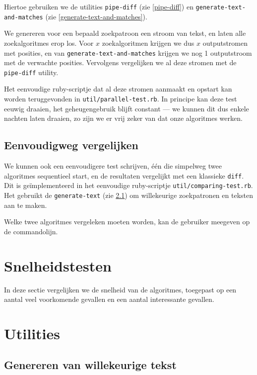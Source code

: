 \documentclass[a4paper,11pt]{article}
\begin{document}
Hiertoe gebruiken we de utilities \verb#pipe-diff# (zie \ref{pipe-diff}) en
\verb#generate-text-and-matches# (zie \ref{generate-text-and-matches}).

We genereren voor een bepaald zoekpatroon een stroom van tekst, en laten
alle zoekalgoritmes erop los. Voor $x$ zoekalgoritmen krijgen we dus $x$
outputstromen met posities, en van \verb#generate-text-and-matches# krijgen we
nog 1 outputstroom met de verwachte posities. Vervolgens vergelijken we al deze
stromen met de \verb#pipe-diff# utility.

Het eenvoudige ruby-scriptje dat al deze stromen aanmaakt en opstart kan worden
teruggevonden in \verb#util/parallel-test.rb#. In principe kan deze test eeuwig
draaien, het geheugengebruik blijft constant — we kunnen dit dus enkele
nachten laten draaien, zo zijn we er vrij zeker van dat onze algoritmes werken.

\subsection{Eenvoudigweg vergelijken}

We kunnen ook een eenvoudigere test schrijven, \'e\'en die simpelweg twee
algoritmes sequentieel start, en de resultaten vergelijkt met een klassieke
\verb#diff#. Dit is ge\"implementeerd in het eenvoudige ruby-scriptje
\verb#util/comparing-test.rb#. Het gebruikt de \verb#generate-text# (zie
\ref{generate-text}) om willekeurige zoekpatronen en teksten aan te maken.

Welke twee algoritmes vergeleken moeten worden, kan de gebruiker meegeven op de
commandolijn.

\section{Snelheidstesten}

In deze sectie vergelijken we de snelheid van de algoritmes, toegepast op een
aantal veel voorkomende gevallen en een aantal interessante gevallen.

\section{Utilities}

\subsection{Genereren van willekeurige tekst}
\label{generate-text}
\end{document}
